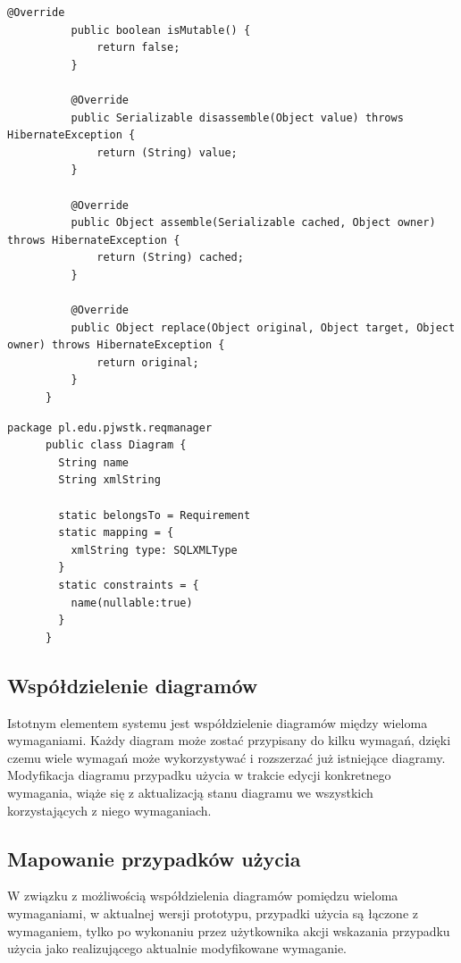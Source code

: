 \begin{lstlisting}[caption={Implementacja niestandardowego typu SQLXMLType}, label={lst:xmlType}]
          @Override
          public boolean isMutable() {
              return false;
          }
       
          @Override
          public Serializable disassemble(Object value) throws HibernateException {
              return (String) value;
          }
       
          @Override
          public Object assemble(Serializable cached, Object owner) throws HibernateException {
              return (String) cached;
          }
       
          @Override
          public Object replace(Object original, Object target, Object owner) throws HibernateException {
              return original;
          }
      }
      \end{lstlisting}

      \newpage

      \begin{lstlisting}[caption={Implementacja modelu Diagram}, label={lst:xml}]
      package pl.edu.pjwstk.reqmanager
      public class Diagram {
        String name
        String xmlString

        static belongsTo = Requirement
        static mapping = {
          xmlString type: SQLXMLType
        }
        static constraints = {
          name(nullable:true)
        }
      }
      \end{lstlisting}

    \subsection{Współdzielenie diagramów}

    Istotnym elementem systemu jest współdzielenie diagramów między wieloma wymaganiami. Każdy diagram może zostać przypisany do kilku wymagań, dzięki czemu wiele wymagań może wykorzystywać i rozszerzać już istniejące diagramy. Modyfikacja diagramu przypadku użycia w trakcie edycji konkretnego wymagania, wiąże się z aktualizacją stanu diagramu we wszystkich korzystających z niego wymaganiach.
    
    \subsection{Mapowanie przypadków użycia}
      W związku z możliwością współdzielenia diagramów pomiędzu wieloma wymaganiami, w aktualnej wersji prototypu, przypadki użycia są łączone z wymaganiem, tylko po wykonaniu przez użytkownika akcji wskazania przypadku użycia jako realizującego aktualnie modyfikowane wymaganie.

